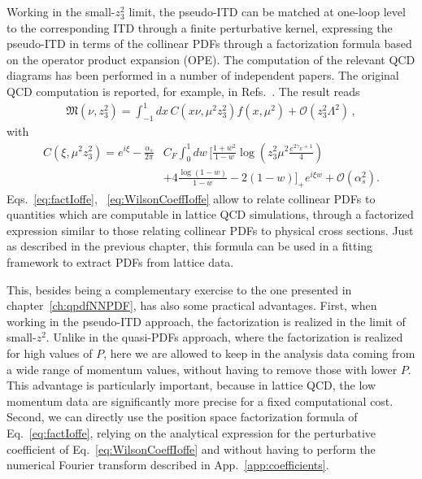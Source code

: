 Working in the small-$z_3^2$ limit, the pseudo-ITD can be matched at one-loop level to the corresponding ITD
through a finite perturbative kernel, expressing the pseudo-ITD in terms of the collinear PDFs through a factorization formula
based on the operator product expansion (OPE).  
The computation of the relevant QCD diagrams has been performed in a number of independent papers.
The original QCD computation is reported, for example, 
in Refs.~\cite{Radyushkin:2017lvu, Radyushkin:2016hsy, Izubuchi:2018srq, Ji:2017rah}.
The result reads
\begin{align}
	\label{eq:factIoffe}
	\mathfrak{M}\left(\nu, z_3^2\right) = \int_{-1}^{1} dx\,C\left(x\nu,\mu^2 z_3^2\right)f\left(x,\mu^2\right) + \mathcal{O}\left(z_3^2\Lambda^2\right)\,, 
\end{align}
with
\begin{align}
	\label{eq:WilsonCoeffIoffe}
	C\left(\xi,\mu^2 z_3^2\right) 
	= e^{i\xi} \nonumber -\frac{\alpha_s}{2\pi}& C_F \int_0^1 dw \, \biggl[\frac{1+w^2}{1-w} \log\left(z_3^2\mu^2\frac{e^{2\gamma_E + 1}}{4}\right) \nonumber \\
	&+4\frac{\log\left(1-w\right)}{1-w} -2\left(1-w\right)\biggr]_+ e^{i \xi w} + \mathcal{O}\left(\alpha_s^2\right).
\end{align}
Eqs.~\eqref{eq:factIoffe}, ~\eqref{eq:WilsonCoeffIoffe} allow to relate collinear PDFs to quantities
which are computable in lattice QCD simulations, through a factorized expression similar to those
relating collinear PDFs to physical cross sections. Just as described in the previous chapter, 
this formula can be used in a fitting framework to extract PDFs from lattice data.

This, besides being a complementary exercise to the one presented in chapter~\ref{ch:qpdfNNPDF}, has also some
practical advantages. First, when working in the pseudo-ITD approach, the factorization is realized in the limit of small-$z^2$.
Unlike in the quasi-PDFs approach, where the factorization is realized for high values of $P$,
here we are allowed to keep in the analysis data coming from a wide range of momentum values, 
without having to remove those with lower $P$.
This advantage is particularly important, because in lattice QCD, the low momentum data are significantly more precise for a fixed computational cost.
Second, we can directly use the position space factorization formula of Eq.~\eqref{eq:factIoffe}, relying on the analytical
expression for the perturbative coefficient of Eq.~\eqref{eq:WilsonCoeffIoffe} and without having
to perform the numerical Fourier transform described in App.~\ref{app:coefficients}.

